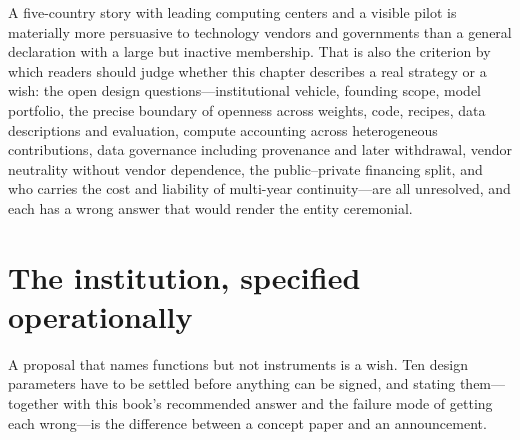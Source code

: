 A five-country story with leading computing centers and a visible pilot is materially more persuasive to technology vendors and governments than a general declaration with a large but inactive membership. That is also the criterion by which readers should judge whether this chapter describes a real strategy or a wish: the open design questions---institutional vehicle, founding scope, model portfolio, the precise boundary of openness across weights, code, recipes, data descriptions and evaluation, compute accounting across heterogeneous contributions, data governance including provenance and later withdrawal, vendor neutrality without vendor dependence, the public--private financing split, and who carries the cost and liability of multi-year continuity---are all unresolved, and each has a wrong answer that would render the entity ceremonial.

\section{The institution, specified operationally}
\label{sec:consortium-spec}

A proposal that names functions but not instruments is a wish. Ten design parameters have to be settled before anything can be signed, and stating them---together with this book's recommended answer and the failure mode of getting each wrong---is the difference between a concept paper and an announcement.

